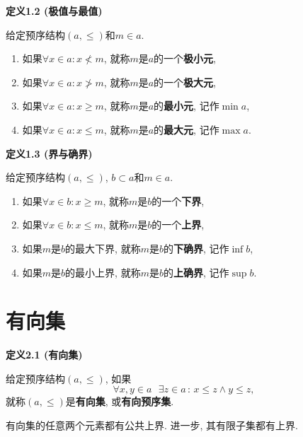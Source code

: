\vspace{10pt}

\hypertarget{sec:定义1.2}{}
\noindent\textbf{定义1.2 (极值与最值)}

给定预序结构$(a,\leqslant)$和$m\in a$.
\begin{enumerate}
    \item 如果$\forall x\in a:x\nless m$, 就称$m$是$a$的一个\textbf{极小元},
    \item 如果$\forall x\in a:x\ngtr m$, 就称$m$是$a$的一个\textbf{极大元},
    \item 如果$\forall x\in a:x\geqslant m$, 就称$m$是$a$的\textbf{最小元},
    记作$\min a$,
    \item 如果$\forall x\in a:x\leqslant m$, 就称$m$是$a$的\textbf{最大元},
    记作$\max a$.
\end{enumerate}

\vspace{10pt}

\hypertarget{sec:定义1.3}{}
\noindent\textbf{定义1.3 (界与确界)}

给定预序结构$(a,\leqslant)$, $b\subset a$和$m\in a$.
\begin{enumerate}
    \item 如果$\forall x\in b:x\geqslant m$, 就称$m$是$b$的一个\textbf{下界},
    \item 如果$\forall x\in b:x\leqslant m$, 就称$m$是$b$的一个\textbf{上界},
    \item 如果$m$是$b$的最大下界, 就称$m$是$b$的\textbf{下确界}, 记作$\inf b$,
    \item 如果$m$是$b$的最小上界, 就称$m$是$b$的\textbf{上确界}, 记作$\sup b$.
\end{enumerate}





\newpage

\section{有向集}

\hypertarget{sec:定义2.1}{}
\noindent\textbf{定义2.1 (有向集)}

给定预序结构$(a,\leqslant)$, 如果
\[
    \forall x,y\in a\,\,\,\,\exists z\in a\,:\,x\leqslant z\land y\leqslant z,
\]
就称$(a,\leqslant)$是\textbf{有向集}, 或\textbf{有向预序集}.

\vspace{10pt}

有向集的任意两个元素都有公共上界. 进一步, 其有限子集都有上界.

